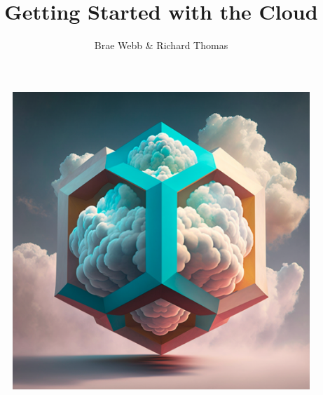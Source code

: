 \documentclass{csse4400}
\title{Getting Started with the Cloud}
\author{Brae Webb \& Richard Thomas}
\date{\week[practical]{4}}
\begin{document}
\maketitle

\begin{figure}[h]
  \begin{center}
    \includegraphics[scale=0.4]{images/hextriscloud}
  \end{center}
\end{figure}

\end{document}
